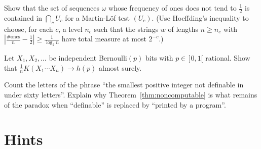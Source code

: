 \begin{exercise}[$\star\star$]\label{ex:lln}
Show that the set of sequences $\omega$ whose frequency of ones does not tend to $\frac12$ is contained in $\bigcap_cU_c$ for a Martin-Löf test $(U_c)$. (Use Hoeffding's inequality to choose, for each $c$, a level $n_c$ such that the strings $w$ of lengths $n\ge n_c$ with $|\frac{\#\text{ones}}n-\frac12|\ge\frac1{\log_2n}$ have total measure at most $2^{-c}$.)
\end{exercise}

\begin{exercise}[$\star\star\star$]\label{ex:ergodic}
Let $X_1,X_2,\dots$ be independent Bernoulli$(p)$ bits with $p\in\,]0,1[$ rational. Show that $\frac1nK(X_1\cdots X_n)\to h(p)$ almost surely.
\end{exercise}

\begin{exercise}[$\star$]\label{ex:berry}
Count the letters of the phrase ``the smallest positive integer not definable in under sixty letters''. Explain why Theorem~\ref{thm:noncomputable} is what remains of the paradox when ``definable'' is replaced by ``printed by a program''.
\end{exercise}

\section{Hints}


